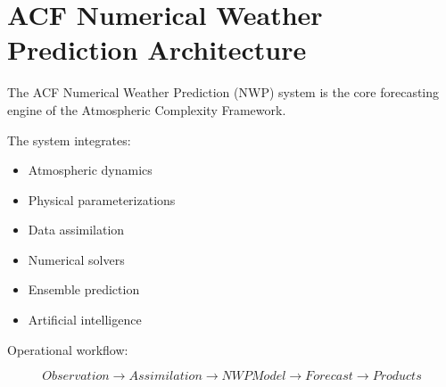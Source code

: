 \section{ACF Numerical Weather Prediction Architecture}


The ACF Numerical Weather Prediction (NWP) system is the core
forecasting engine of the Atmospheric Complexity Framework.



The system integrates:


\begin{itemize}

\item Atmospheric dynamics

\item Physical parameterizations

\item Data assimilation

\item Numerical solvers

\item Ensemble prediction

\item Artificial intelligence

\end{itemize}



Operational workflow:


\[
Observation
\rightarrow
Assimilation
\rightarrow
NWP Model
\rightarrow
Forecast
\rightarrow
Products
\]
